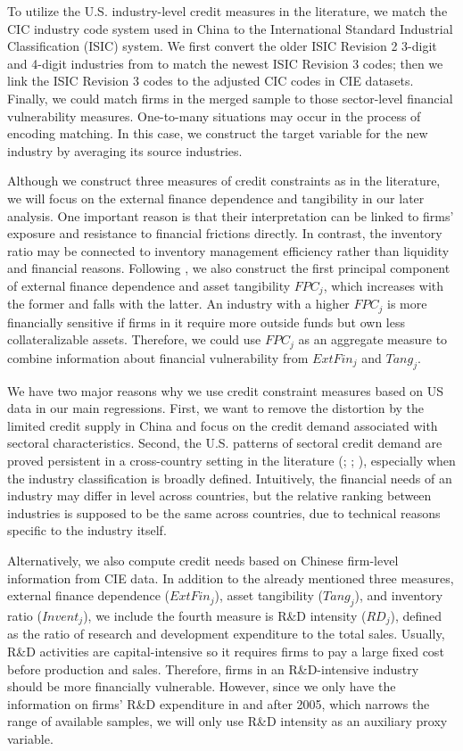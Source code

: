 \documentclass[12pt]{article}
\begin{document}
To utilize the U.S. industry-level credit measures in the literature, we match the CIC industry code system used in China to the International Standard Industrial Classification (ISIC) system. We first convert the older ISIC Revision 2 3-digit and 4-digit industries from \cite{manova-wei-zhang2015} to match the newest ISIC Revision 3 codes; then we link the ISIC Revision 3 codes to the adjusted CIC codes in CIE datasets. Finally, we could match firms in the merged sample to those sector-level financial vulnerability measures. One-to-many situations may occur in the process of encoding matching. In this case, we construct the target variable for the new industry by averaging its source industries.

Although we construct three measures of credit constraints as in the literature, we will focus on the external finance dependence and tangibility in our later analysis. One important reason is that their interpretation can be linked to firms' exposure and resistance to financial frictions directly. In contrast, the inventory ratio may be connected to inventory management efficiency rather than liquidity and financial reasons. Following \cite{manova-wei-zhang2015}, we also construct the first principal component of external finance dependence and asset tangibility $FPC_j$, which increases with the former and falls with the latter. An industry with a higher $FPC_j$ is more financially sensitive if firms in it require more outside funds but own less collateralizable assets. Therefore, we could use $FPC_j$ as an aggregate measure to combine information about financial vulnerability from $ExtFin_j$ and $Tang_j$.

We have two major reasons why we use credit constraint measures based on US data in our main regressions. First, we want to remove the distortion by the limited credit supply in China and focus on the credit demand associated with sectoral characteristics. Second, the U.S. patterns of sectoral credit demand are proved persistent in a cross-country setting in the literature (\cite{kroszner2007}; \cite{manova-wei-zhang2015}; \cite{fan-lai-li2015}), especially when the industry classification is broadly defined. Intuitively, the financial needs of an industry may differ in level across countries, but the relative ranking between industries is supposed to be the same across countries, due to technical reasons specific to the industry itself.

Alternatively, we also compute credit needs based on Chinese firm-level information from CIE data. In addition to the already mentioned three measures, external finance dependence ($ExtFin_j$), asset tangibility ($Tang_j$), and inventory ratio ($Invent_j$), we include the fourth measure is R\&D intensity ($RD_j$), defined as the ratio of research and development expenditure to the total sales. Usually, R\&D activities are capital-intensive so it requires firms to pay a large fixed cost before production and sales. Therefore, firms in an R\&D-intensive industry should be more financially vulnerable. However, since we only have the information on firms' R\&D expenditure in and after 2005, which narrows the range of available samples, we will only use R\&D intensity as an auxiliary proxy variable. 
\end{document}
